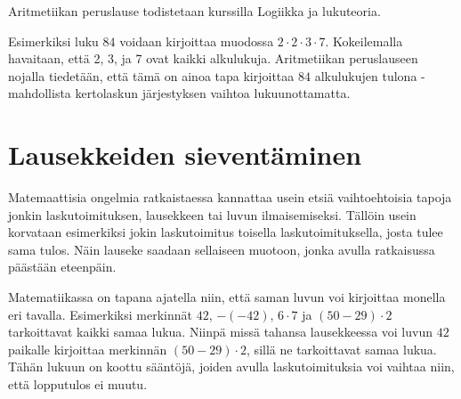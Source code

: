    Aritmetiikan peruslause todistetaan kurssilla Logiikka ja lukuteoria.
    
    Esimerkiksi luku $84$ voidaan kirjoittaa muodossa $2\cdot 2\cdot 3\cdot 7$. Kokeilemalla havaitaan, että 2, 3, ja 7 ovat kaikki alkulukuja. Aritmetiikan peruslauseen nojalla tiedetään, että tämä on ainoa tapa kirjoittaa $84$ alkulukujen tulona - mahdollista kertolaskun järjestyksen vaihtoa lukuunottamatta.
    
    
    


\section{Lausekkeiden sieventäminen}

Matemaattisia ongelmia ratkaistaessa kannattaa usein etsiä vaihtoehtoisia tapoja jonkin laskutoimituksen, lausekkeen tai luvun ilmaisemiseksi. Tällöin usein korvataan esimerkiksi jokin laskutoimitus toisella laskutoimituksella, josta tulee sama tulos. Näin lauseke saadaan sellaiseen muotoon, jonka avulla ratkaisussa päästään eteenpäin.

Matematiikassa on tapana ajatella niin, että saman luvun voi kirjoittaa monella eri tavalla. Esimerkiksi merkinnät $42$, $-(-42)$, $6\cdot 7$ ja $(50-29)\cdot 2$ tarkoittavat kaikki samaa lukua. Niinpä missä tahansa lausekkeessa voi luvun $42$ paikalle kirjoittaa merkinnän $(50-29)\cdot 2$, sillä ne tarkoittavat samaa lukua. Tähän lukuun on koottu sääntöjä, joiden avulla laskutoimituksia voi vaihtaa niin, että lopputulos ei muutu.

